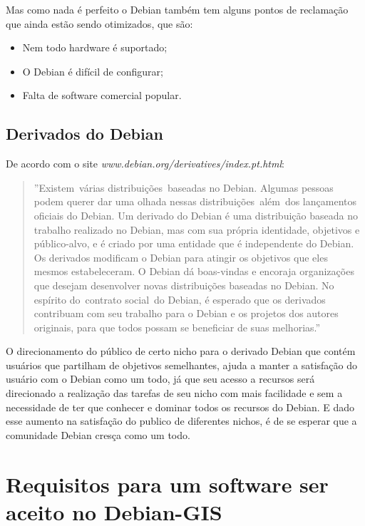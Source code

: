 Mas como nada é perfeito o Debian também tem alguns pontos de reclamação que ainda estão sendo otimizados, que são:

\begin{itemize}
	\item Nem todo hardware é suportado;
	\item O Debian é difícil de configurar;
	\item Falta de software comercial popular.

\end{itemize}

\subsection{Derivados do Debian}

De acordo com o site \textit{www.debian.org/derivatives/index.pt.html}: 

\begin{quote}
	''Existem várias distribuições baseadas no Debian. Algumas pessoas podem querer dar uma olhada nessas distribuições além dos lançamentos oficiais do Debian. Um derivado do Debian é uma distribuição baseada no trabalho realizado no Debian, mas com sua própria identidade, objetivos e público-alvo, e é criado por uma entidade que é independente do Debian. Os derivados modificam o Debian para atingir os objetivos que eles mesmos estabeleceram. O Debian dá boas-vindas e encoraja organizações que desejam desenvolver novas distribuições baseadas no Debian. No espírito do contrato social do Debian, é esperado que os derivados contribuam com seu trabalho para o Debian e os projetos dos autores originais, para que todos possam se beneficiar de suas melhorias.''
\end{quote}

O direcionamento do público de certo nicho para o derivado Debian que contém usuários que partilham de objetivos semelhantes, ajuda a manter a satisfação do usuário com o Debian como um todo, já que seu acesso a recursos será direcionado a realização das tarefas de seu nicho com mais facilidade e sem a necessidade de ter que conhecer e dominar todos os recursos do Debian. E dado esse aumento na satisfação do publico de diferentes nichos, é de se esperar que a comunidade Debian cresça como um todo.



\section{Requisitos para um software ser aceito no Debian-GIS}


